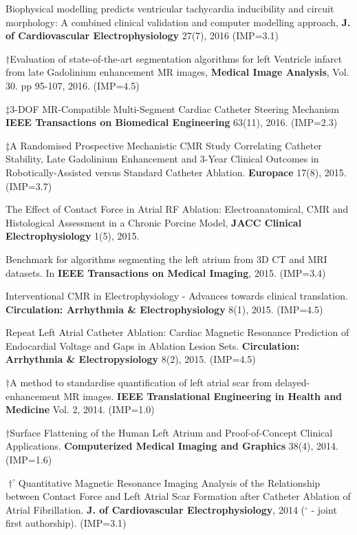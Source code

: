 \begin{etaremune}
\item Biophysical modelling predicts ventricular tachycardia inducibility and circuit morphology:  A combined clinical validation and computer modelling approach, \textbf{J. of Cardiovascular Electrophysiology} 27(7), 2016 (IMP=3.1)
\item $\dagger$Evaluation of state-of-the-art segmentation algorithms for left Ventricle infarct from late Gadolinium enhancement MR images, \textbf{Medical Image Analysis}, Vol. 30. pp 95-107, 2016. (IMP=4.5)
\item $\ddagger$3-DOF MR-Compatible Multi-Segment Cardiac Catheter Steering Mechanism \textbf{IEEE Transactions on Biomedical Engineering} 63(11), 2016. (IMP=2.3)
\item $\ddagger$A Randomised Prospective Mechanistic CMR Study Correlating Catheter Stability, Late Gadolinium Enhancement and 3-Year Clinical Outcomes in Robotically-Assisted versus Standard Catheter Ablation.  \textbf{Europace} 17(8), 2015. (IMP=3.7)
\item The Effect of Contact Force in Atrial RF Ablation: Electroanatomical, CMR and Histological Assessment in a Chronic Porcine Model, \textbf{JACC Clinical Electrophysiology} 1(5), 2015. 
\item Benchmark for algorithms segmenting the left atrium from 3D CT and MRI datasets. In \textbf{IEEE Transactions on Medical Imaging}, 2015. (IMP=3.4)
\item Interventional CMR in Electrophysiology - Advances towards clinical translation. \textbf{Circulation: Arrhythmia \& Electrophysiology} 8(1), 2015. (IMP=4.5)
\item Repeat Left Atrial Catheter Ablation: Cardiac Magnetic Resonance Prediction of Endocardial Voltage and Gaps in Ablation Lesion Sets. \textbf{Circulation: Arrhythmia \& Electropysiology} 8(2), 2015. (IMP=4.5)
\item $\dagger$A method to standardise quantification of left atrial scar from delayed-enhancement MR images. \textbf{IEEE Translational Engineering in Health and Medicine} Vol. 2, 2014. (IMP=1.0)
\item $\dagger$Surface Flattening of the Human Left Atrium and Proof-of-Concept Clinical Applications. \textbf{Computerized Medical Imaging and Graphics} 38(4), 2014. (IMP=1.6)
\item $\dagger^\circ$Quantitative Magnetic Resonance Imaging Analysis of the Relationship between Contact Force and Left Atrial Scar Formation after Catheter Ablation of Atrial Fibrillation. \textbf{J. of Cardiovascular Electrophysiology}, 2014 ($^\circ$ - joint first authorship). (IMP=3.1)

\end{etaremune}

